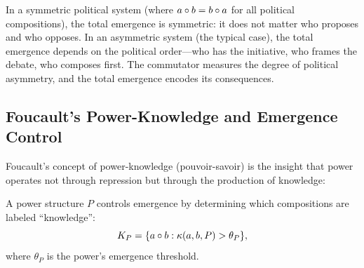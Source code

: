 \begin{interpretation}
In a symmetric political system (where $a \circ b = b \circ a$ for all
political compositions), the total emergence is symmetric: it does not matter
who proposes and who opposes. In an asymmetric system (the typical case), the
total emergence depends on the political order---who has the initiative, who
frames the debate, who composes first. The commutator measures the degree of
political asymmetry, and the total emergence encodes its consequences.
\end{interpretation}



\subsection{Foucault's Power-Knowledge and Emergence Control}

Foucault's concept of power-knowledge (pouvoir-savoir) is the insight that power
operates not through repression but through the production of knowledge:

\begin{theorem}
\label{thm:power-knowledge}
A power structure $P$ controls emergence by determining which compositions are
labeled ``knowledge'':
\[
  K_P = \{a \circ b : \kappa(a,b,P) > \theta_P\},
\]
where $\theta_P$ is the power's emergence threshold.
\end{theorem}

